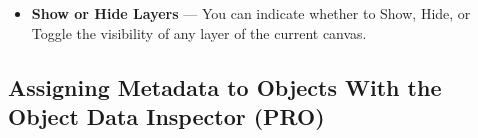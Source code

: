 \documentclass[../main.tex]{subfiles}
\begin{document}
\begin{ogpro}
\begin{itemize}

      Locations you can choose from include:

      \begin{itemize}
        \item Highlight an Object
        \item Center on a Point
        \item Zoom to Display a Rectangle
        \item Switch to the Previous Canvas
        \item Switch to the Next Canvas
        \item Switch to a Specific Canvas
      \end{itemize}

      Some of these options offer a canvas preview, in which you can click or drag to indicate
      which object to highlight, which point to center on, or where to zoom. If you select
      \textbf{Switch to a Specific Canvas}, use the \textbf{Canvas} pop-up menu to choose from
      one of the canvases in your project.
    \item \textbf{Show or Hide Layers} --- You can indicate whether to Show, Hide, or Toggle the
      visibility of any layer of the current canvas.

  \end{itemize}
\end{ogpro}

\subsection{Assigning Metadata to Objects With the Object Data Inspector
(\texorpdfstring{\textbf{PRO}}{PRO})}
\end{document}
